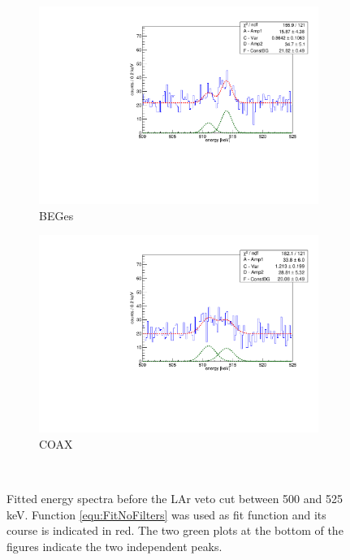 \documentclass[encoding=utf8,british]{tumphthesis}
\begin{document}
\begin{figure}[t!]
	\centering
	\begin{subfigure}{.5\textwidth}
		\centering
		\includegraphics[width=\textwidth]{./Bilder/500525FitNoFilterBEGes.pdf}
		\caption{BEGes}
		\label{fig:FitNoFilterBEGes}
	\end{subfigure}\hfill%
	\begin{subfigure}{.5\textwidth}
		\centering
		\includegraphics[width=\textwidth]{./Bilder/500525FitNoFilterCOAX.pdf}
		\caption{COAX}
		\label{fig:FitNoFilterCOAX}
	\end{subfigure}
    \\
	\caption{
		Fitted energy spectra before the LAr veto cut between 500 and 525 keV. 
		Function \ref{equ:FitNoFilters} was used as fit function and its course is indicated in red. 
		The two green plots at the bottom of the figures indicate the two independent peaks. 
		}
\end{figure}
\\
\end{document}
